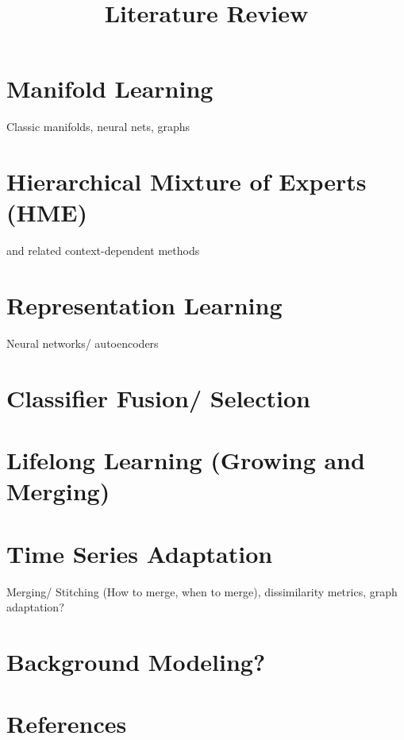 \documentclass{article}[12 pt]
\begin{document}
\title{Literature Review}
\date{}
\maketitle


\section*{Manifold Learning}
    Classic manifolds, neural nets, graphs

\section*{Hierarchical Mixture of Experts (HME)}
    and related context-dependent methods

\section*{Representation Learning}
    Neural networks/ autoencoders

\section*{Classifier Fusion/ Selection}

\section*{Lifelong Learning (Growing and Merging)}

\section*{Time Series Adaptation}
    Merging/ Stitching (How  to merge, when to merge), dissimilarity metrics, graph adaptation?

\section*{Background Modeling?}



\section*{References}

\end{document}
